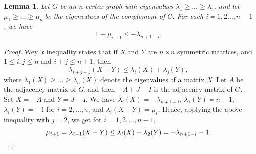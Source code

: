 \documentclass[11pt]{article}
\theoremstyle{plain}
\newtheorem{lemma}[theorem]{Lemma}
\theoremstyle{definition}
\begin{document}
\begin{lemma}\label{lemma:dens4_weyl}
    Let $G$ be an $n$ vertex graph with eigenvalues $\lambda_1\geq \dots\geq \lambda_n$, and let $\mu_1\geq \dots\geq \mu_n$ be the eigenvalues of the complement of $G$. 
    For each $i=1,2\dots,n-1$, we have $$1+\mu_{i+1}\leq -\lambda_{n+1-i}.$$
\end{lemma}
\begin{proof}
    Weyl's inequality states that if $X$ and $Y$ are $n\times n$ symmetric matrices, and $1\leq i,j\leq n$ and $i+j\leq n+1$, then $$\lambda_{i+j-1}(X+Y)\leq \lambda_i(X)+\lambda_j(Y),$$
    where $\lambda_1(X)\geq \dots\geq \lambda_n(X)$ denote the eigenvalues of a matrix $X$. 
    Let $A$ be the adjacency matrix of $G$, and then $-A+J-I$ is the adjacency matrix of $\overline{G}$.
    Set $X=-A$ and $Y=J-I$.
    We have $\lambda_i(X)=-\lambda_{n+1-i}$, $\lambda_1(Y)=n-1$, $\lambda_i(Y)=-1$ for $i=2,\dots,n$, and $\lambda_i(X+Y)=\mu_i$. 
    Hence, applying the above inequality with $j=2$, we get for $i=1,2,\dots,n-1$, 
    \[\mu_{i+1}=\lambda_{i+1}(X+Y) \le \lambda_i(X) + \lambda_2(Y) = -\lambda_{n+1-i}-1. \hfill\qedhere\]
\end{proof}
\end{document}
